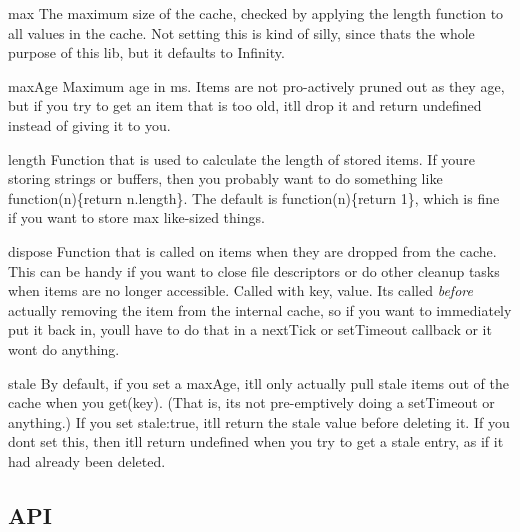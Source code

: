 \begin{DoxyItemize}
\item {\ttfamily max} The maximum size of the cache, checked by applying the length function to all values in the cache. Not setting this is kind of silly, since that\textquotesingle{}s the whole purpose of this lib, but it defaults to {\ttfamily Infinity}.
\item {\ttfamily max\+Age} Maximum age in ms. Items are not pro-\/actively pruned out as they age, but if you try to get an item that is too old, it\textquotesingle{}ll drop it and return undefined instead of giving it to you.
\item {\ttfamily length} Function that is used to calculate the length of stored items. If you\textquotesingle{}re storing strings or buffers, then you probably want to do something like {\ttfamily function(n)\{return n.\+length\}}. The default is {\ttfamily function(n)\{return 1\}}, which is fine if you want to store {\ttfamily max} like-\/sized things.
\item {\ttfamily dispose} Function that is called on items when they are dropped from the cache. This can be handy if you want to close file descriptors or do other cleanup tasks when items are no longer accessible. Called with {\ttfamily key, value}. It\textquotesingle{}s called {\itshape before} actually removing the item from the internal cache, so if you want to immediately put it back in, you\textquotesingle{}ll have to do that in a {\ttfamily next\+Tick} or {\ttfamily set\+Timeout} callback or it won\textquotesingle{}t do anything.
\item {\ttfamily stale} By default, if you set a {\ttfamily max\+Age}, it\textquotesingle{}ll only actually pull stale items out of the cache when you {\ttfamily get(key)}. (That is, it\textquotesingle{}s not pre-\/emptively doing a {\ttfamily set\+Timeout} or anything.) If you set {\ttfamily stale\+:true}, it\textquotesingle{}ll return the stale value before deleting it. If you don\textquotesingle{}t set this, then it\textquotesingle{}ll return {\ttfamily undefined} when you try to get a stale entry, as if it had already been deleted.
\end{DoxyItemize}

\subsection*{A\+PI}


